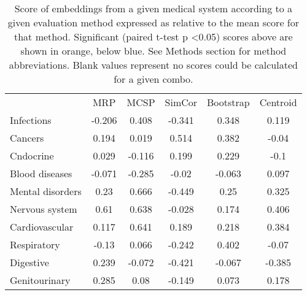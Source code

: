 \documentclass[10pt]{article}
\def\blu#1{{\color{blu}#1}}
\def\ora#1{{\color{ora}#1}}
\begin{document}
\begin{table*}[]
	\caption{Score of embeddings from a given medical system according to a given evaluation method expressed as relative to the mean score for that method. Significant (paired t-test p \textless 0.05) scores above are shown in orange, below blue. See Methods section for method abbreviations. Blank values represent no scores could be calculated for a given combo.}
	\label{tab:allsystemresults}
	\begin{tabular}{lccccc}
		& MRP                           & MCSP                          & SimCor                        & Bootstrap                    & Centroid                     \\
		Infections           & -0.206                        & 0.408                         & \blu{-0.341} & \ora{0.348} & 0.119                        \\
		Cancers              & \ora{0.194}  & 0.019                         & \ora{0.514}  & 0.382                        & -0.04                        \\
		Cndocrine            & 0.029                         & \blu{-0.116} & \ora{0.199}  & 0.229                        & -0.1                         \\
		Blood diseases       & -0.071                        & \blu{-0.285} & -0.02                         & -0.063                       & 0.097                        \\
		Mental disorders     & \ora{0.23}   & \ora{0.666}  & -0.449                        & 0.25                         & \ora{0.325} \\
		Nervous system       & \ora{0.61}   & \ora{0.638}  & -0.028                        & 0.174                        & \ora{0.406} \\
		Cardiovascular       & \ora{0.117}  & \ora{0.641}  & 0.189                         & 0.218                        & \ora{0.384} \\
		Respiratory          & -0.13                         & 0.066                         & \blu{-0.242} & \ora{0.402} & -0.07                        \\
		Digestive            & 0.239                         & -0.072                        & \blu{-0.421} & -0.067                       & -0.385                       \\
		Genitourinary        & 0.285                         & 0.08                          & -0.149                        & 0.073                        & \ora{0.178} \\

\end{tabular}
\end{table*}
\end{document}
